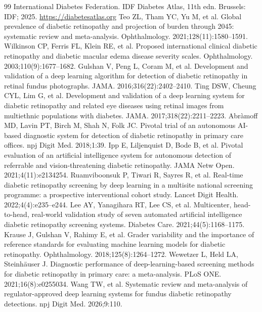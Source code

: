 \footnotesize
\begin{thebibliography}{99}\setlength{\itemsep}{0pt}
 International Diabetes Federation. IDF Diabetes Atlas, 11th edn. Brussels: IDF; 2025. \url{https://diabetesatlas.org}
 Teo ZL, Tham YC, Yu M, et al. Global prevalence of diabetic retinopathy and projection of burden through 2045: systematic review and meta-analysis. Ophthalmology. 2021;128(11):1580--1591.
 Wilkinson CP, Ferris FL, Klein RE, et al. Proposed international clinical diabetic retinopathy and diabetic macular edema disease severity scales. Ophthalmology. 2003;110(9):1677--1682.
 Gulshan V, Peng L, Coram M, et al. Development and validation of a deep learning algorithm for detection of diabetic retinopathy in retinal fundus photographs. JAMA. 2016;316(22):2402--2410.
 Ting DSW, Cheung CYL, Lim G, et al. Development and validation of a deep learning system for diabetic retinopathy and related eye diseases using retinal images from multiethnic populations with diabetes. JAMA. 2017;318(22):2211--2223.
 Abr\`amoff MD, Lavin PT, Birch M, Shah N, Folk JC. Pivotal trial of an autonomous AI-based diagnostic system for detection of diabetic retinopathy in primary care offices. npj Digit Med. 2018;1:39.
 Ipp E, Liljenquist D, Bode B, et al. Pivotal evaluation of an artificial intelligence system for autonomous detection of referrable and vision-threatening diabetic retinopathy. JAMA Netw Open. 2021;4(11):e2134254.
 Ruamviboonsuk P, Tiwari R, Sayres R, et al. Real-time diabetic retinopathy screening by deep learning in a multisite national screening programme: a prospective interventional cohort study. Lancet Digit Health. 2022;4(4):e235--e244.
 Lee AY, Yanagihara RT, Lee CS, et al. Multicenter, head-to-head, real-world validation study of seven automated artificial intelligence diabetic retinopathy screening systems. Diabetes Care. 2021;44(5):1168--1175.
 Krause J, Gulshan V, Rahimy E, et al. Grader variability and the importance of reference standards for evaluating machine learning models for diabetic retinopathy. Ophthalmology. 2018;125(8):1264--1272.
 Wewetzer L, Held LA, Steinh\"auser J. Diagnostic performance of deep-learning-based screening methods for diabetic retinopathy in primary care: a meta-analysis. PLoS ONE. 2021;16(8):e0255034.
 Wang TW, et al. Systematic review and meta-analysis of regulator-approved deep learning systems for fundus diabetic retinopathy detections. npj Digit Med. 2026;9:110.

\end{thebibliography}
